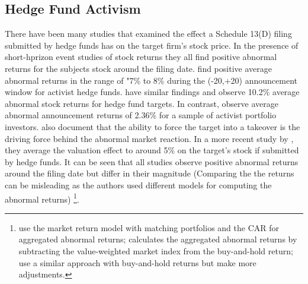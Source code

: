 \documentclass[12pt]{article}
\begin{document}
\subsection{Hedge Fund Activism}
There have been many studies that examined the effect a Schedule 13(D) filing submitted by hedge funds has on the target firm's stock price. In the presence of short-hprizon event studies of stock returns they all find positive abnormal returns for the subjects stock around the filing date. 
\citet[p.1730]{Brav2008} find positive average abnormal returns in the range of "7\% to 8\% during the (-20,+20) announcement window for activist hedge funds. \citet{Klein2009} have similar findings and observe 10.2\% average abnormal stock returns for hedge fund targets. In contrast, \citet{Greenwood2009} observe average abnormal announcement returns of 2.36\% for a sample of activist portfolio investors.\citet{Greenwood2009} also document that the ability to force the target into a takeover is the driving force behind the abnormal market reaction. In a more recent study by \citet{Denes2017}, they average the valuation effect to around 5\% on the target's stock if submitted by hedge funds. It can be seen that all studies observe positive abnormal returns around the filing date but differ in their magnitude (Comparing the the returns can be misleading as the authors used different models for computing the abnormal returns)
	\footnote{\citet{Greenwood2009} use the market return model with matching portfolios and the CAR for aggregated abnormal returns; \citet{Brav2008} calculates the aggregated abnormal returns by subtracting the value-weighted market index from the buy-and-hold return; \citet{Klein2009} use a similar approach with buy-and-hold returns but make more adjustments.}.
\end{document}
